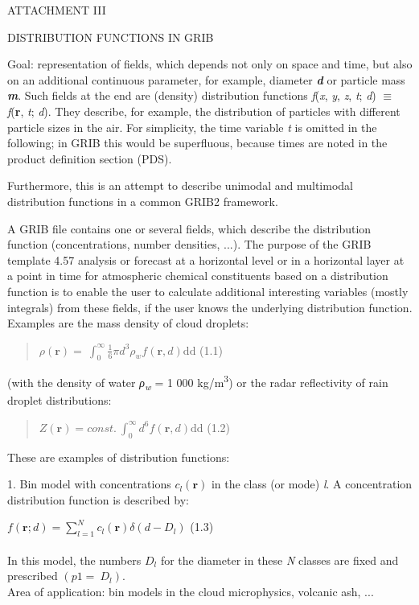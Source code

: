 ATTACHMENT III

DISTRIBUTION FUNCTIONS IN GRIB

Goal: representation of fields, which depends not only on space and time, but also on an additional continuous parameter, for example, diameter \emph{\textbf{d}} or particle mass \emph{\textbf{m}}. Such fields at the end are (density) distribution functions \emph{f}(\emph{x}, \emph{y}, \emph{z}, \emph{t}; \emph{d}) \(\equiv\) \emph{f}(\textbf{r}, \emph{t}; \emph{d}). They describe, for example, the distribution of particles with different particle sizes in the air. For simplicity, the time variable \emph{t} is omitted in the following; in GRIB this would be superfluous, because times are noted in the product definition section (PDS).

Furthermore, this is an attempt to describe unimodal and multimodal distribution functions in a common GRIB2 framework.

A GRIB file contains one or several fields, which describe the distribution function (concentrations, number densities, ...). The purpose of the GRIB template 4.57 analysis or forecast at a horizontal level or in a horizontal layer at a point in time for atmospheric chemical constituents based on a distribution function is to enable the user to calculate additional interesting variables (mostly integrals) from these fields, if the user knows the underlying distribution function. Examples are the mass density of cloud droplets:

\begin{quote}
\(\rho\left( \mathbf{r} \right) = \ \int_{0}^{\infty}{\frac{1}{6}\pi d^{3}}\rho_{w}f\left( \mathbf{r},d \right)\text{dd}\) (1.1)
\end{quote}

(with the density of water \emph{ρ\textsubscript{w}} = 1 000 kg/m\textsuperscript{3}) or the radar reflectivity of rain droplet distributions:

\begin{quote}
\(Z\left( \mathbf{r} \right) = const.\ \int_{0}^{\infty}d^{6}f\left( \mathbf{r},d \right)\text{dd}\) (1.2)
\end{quote}

These are examples of distribution functions:

1. Bin model with concentrations \(c_{l}\left( \mathbf{r} \right)\) in the class (or mode) \emph{l}. A concentration distribution function is described by:

\(f\left( \mathbf{r};d \right) = \sum_{l = 1}^{N}{c_{l}\left( \mathbf{r} \right)}\delta(d - D_{l})\) (1.3)\\
~\\
In this model, the numbers \(D_{l}\) for the diameter in these \emph{N} classes are fixed and prescribed \((p1 = \ D_{l})\).\\
Area of application: bin models in the cloud microphysics, volcanic ash, ...

